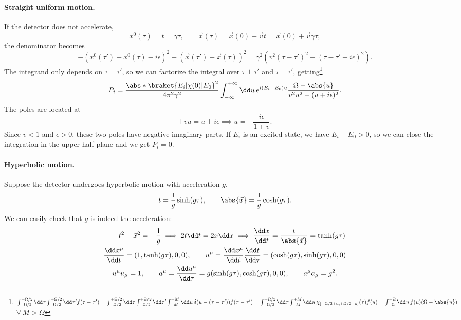 \documentclass[a4paper,12pt]{book}
\begin{document}
\paragraph{Straight uniform motion.} If the detector does not accelerate,
\[x^0(\tau)=t=\gamma\tau,\qquad\vec x(\tau)=\vec x(0)+\vec vt=\vec x(0)+\vec v\gamma\tau,\]the denominator becomes
\[-(x^0(\tau')-x^0(\tau)-i\epsilon)^2+(\vec x(\tau')-\vec x(\tau))^2=\gamma^2(v^2(\tau-\tau')^2-(\tau-\tau'+i\epsilon)^2).\]
The integrand only depends on $\tau-\tau'$, so we can factorize the integral over $\tau+\tau'$ and $\tau-\tau'$, getting\footnote{$\int_{-\Omega/2}^{+\Omega/2}\dd\tau\int_{-\Omega/2}^{+\Omega/2}\dd\tau' f(\tau-\tau')=\int_{-\Omega/2}^{+\Omega/2}\dd\tau\int_{-\Omega/2}^{+\Omega/2}\dd\tau'\int_{-M}^{+M}\dd u\,\delta(u-(\tau-\tau')) f(\tau-\tau')=\int_{-\Omega/2}^{+\Omega/2}\dd\tau\int_{-M}^{+M}\dd u\, \chi_{[-\Omega/2+u,+\Omega/2+u]}(\tau)f(u)=\int_{-\Omega}^{+\Omega}\dd u\,f(u)(\Omega-\abs{u})$ $\forall\,M>\Omega$}
\[P_i=\frac{\abs*{\braket{E_i|\chi(0)|E_0}}^2}{4\pi^2\gamma^2}\int_{-\infty}^{+\infty}\dd u\,e^{i(E_i-E_0)u}\frac{\Omega-\abs{u}}{v^2u^2-(u+i\epsilon)^2}.\]
The poles are located at
\[\pm vu=u+i\epsilon\implies u=-\frac{i\epsilon}{1\mp v}.\]
Since $v<1$ and $\epsilon>0$, these two poles have negative imaginary parts. If $E_i$ is an excited state, we have $E_i-E_0>0$, so we can close the integration in the upper half plane and we get $P_i=0$.

\paragraph{Hyperbolic motion.} Suppose the detector undergoes hyperbolic motion with acceleration $g$,
\[t=\frac1g\sinh(g\tau),\qquad \abs{\vec x}=\frac1g\cosh(g\tau).\]
We can easily check that $g$ is indeed the acceleration:
\begin{gather*}
\qquad t^2-\vec x^2=-\frac1g\implies 2t\dd t=2x\dd x\implies\frac{\dd x}{\dd t}=\frac t{\abs{\vec x}}=\tanh(g\tau)\\
\frac{\dd x^\mu}{\dd t}=(1,\tanh(g\tau),0,0),\qquad u^\mu=\frac{\dd x^\mu}{\dd t}\frac{\dd t}{\dd \tau}=(\cosh(g\tau),\sinh(g\tau),0,0)\\
u^\mu u_\mu=1,\qquad a^\mu=\frac{\dd u^\mu}{\dd\tau}=g(\sinh(g\tau),\cosh(g\tau),0,0),\qquad a^\mu a_\mu=g^2.
\end{gather*}
\end{document}

